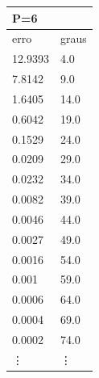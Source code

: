 \begin{table}[]
\begin{tabular}{|l|l|}
\end{tabular}
\begin{tabular}{|l|l|}
\hline
\multicolumn{2}{|l|}{P=6} \\ \hline
erro         & graus      \\ \hline
12.9393      & 4.0        \\ \hline
7.8142       & 9.0        \\ \hline
1.6405       & 14.0       \\ \hline
0.6042       & 19.0       \\ \hline
0.1529       & 24.0       \\ \hline
0.0209       & 29.0       \\ \hline
0.0232       & 34.0       \\ \hline
0.0082       & 39.0       \\ \hline
0.0046       & 44.0       \\ \hline
0.0027       & 49.0       \\ \hline
0.0016       & 54.0       \\ \hline
0.001        & 59.0       \\ \hline
0.0006       & 64.0       \\ \hline
0.0004       & 69.0       \\ \hline
0.0002       & 74.0       \\ \hline
\vdots	      & \vdots      \\
\end{tabular}
\end{table}
